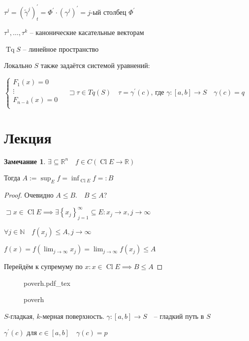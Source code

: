 \documentclass{book}
\newcommand\N{\ensuremath{\mathbb{N}}}
\newcommand\R{\ensuremath{\mathbb{R}}}
\newcommand{\p}[1]{#1^{\prime}}
\newcommand{\tl}[1]{\widetilde{#1}}
\theoremstyle{definition}
\newtheorem*{note}{Замечание}
\newcommand{\incfig}[1]{%
    \def\svgwidth{\columnwidth}
    {#1.pdf_tex}
}
\DeclareMathOperator{\Cl}{Cl}
\DeclareMathOperator{\Tq}{Tq}
\begin{document}
$\tau^j = \left( \tl \gamma^j \right) ^{\prime}_t = \p \Phi \cdot  \left( \gamma^j \right) ^{\prime} = j$-ый столбец $\p\Phi$ 

$\tau^1, \ldots, \tau^k$ -- канонические касательные векторам

\begin{statement}
    $\Tq S$ -- линейное пространство
\end{statement}

Локально $S$ также задаётся системой уравнений:

 $\begin{cases}
     F_1(x) = 0\\ \vdots \\ F_{n-k}(x) = 0\\
 \end{cases}\quad \sqsupset \tau\in Tq(S)\quad \tau = \p\gamma(c)$, где $\gamma: [a,b]\to S\quad \gamma(c) = q$

 \section{Лекция}

 \begin{note}
     $\exists \subseteq \R^n\quad f\in C\left( \Cl E \to \R \right) $

     Тогда $A := \sup_E f = \inf_{\Cl E} f =: B$
 \end{note}
 \begin{proof}
     Очевидно $A \leqslant B.\quad B\leqslant A$?

     $\sqsupset x\in \Cl E \implies \exists \left\{ x_j \right\} _{j=1}^{\infty }\subseteq E: x_j\to x, j\to \infty $

     $\forall j\in \N \quad f(x_j)\leqslant A, j\to \infty $

     $f(x) = f\left( \lim_{j \to \infty} x_j \right)  = \lim_{j \to \infty} f(x_j) \leqslant A$

     Перейдём к супремуму по $x: x\in \Cl E \implies B\leqslant A$
 \end{proof}

\begin{figure}[!ht]
    \centering
    \incfig{poverh}
    \caption{poverh}
    \label{fig:poverh}
\end{figure}

$S$-гладкая,  $k$-мерная поверхность.  $\gamma:[a,b]\to S\quad $-- гладкий путь в $S$

$\p \gamma(c)$ для  $c\in [a,b]\quad \gamma(c) = p$
\end{document}

